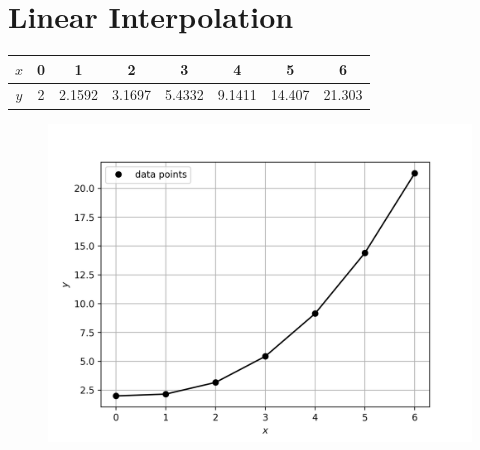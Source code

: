 \documentclass[12,a4paper]{article}
\begin{document}
    \section{Linear Interpolation}
    \begin{table}[H]
        \centering
        \begin{tabular}{ |c|c|c|c|c|c|c|c| }
            \hline
            $x$ & 0 & 1 & 2 & 3 & 4 & 5 & 6\\
            \hline
            $y$ & 2 & 2.1592 & 3.1697 & 5.4332 & 9.1411 & 14.407 & 21.303\\
            \hline
        \end{tabular}
    \end{table}
    \begin{figure}[H]
        \centering
        \includegraphics[width=\textwidth]{plots/q4.png}
        \label{fig:my_label}
    \end{figure}
\end{document}
